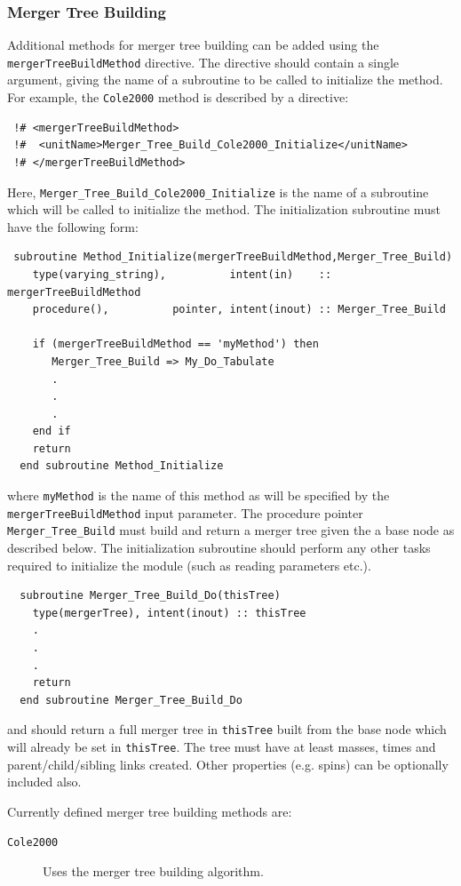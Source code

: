 \subsubsection{Merger Tree Building}\label{sec:MergerTreeBuildMethod}

Additional methods for merger tree building can be added using the {\tt mergerTreeBuildMethod} directive. The directive should contain a single argument, giving the name of a subroutine to be called to initialize the method. For example, the {\tt Cole2000} method is described by a directive:
\begin{verbatim}
 !# <mergerTreeBuildMethod>
 !#  <unitName>Merger_Tree_Build_Cole2000_Initialize</unitName>
 !# </mergerTreeBuildMethod>
\end{verbatim}
Here, {\tt Merger\_Tree\_Build\_Cole2000\_Initialize} is the name of a subroutine which will be called to initialize the method. The initialization subroutine must have the following form:
\begin{verbatim}
 subroutine Method_Initialize(mergerTreeBuildMethod,Merger_Tree_Build)
    type(varying_string),          intent(in)    :: mergerTreeBuildMethod
    procedure(),          pointer, intent(inout) :: Merger_Tree_Build
    
    if (mergerTreeBuildMethod == 'myMethod') then
       Merger_Tree_Build => My_Do_Tabulate
       .
       .
       .
    end if
    return
  end subroutine Method_Initialize
\end{verbatim}
where {\tt myMethod} is the name of this method as will be specified by the {\tt mergerTreeBuildMethod} input parameter. The procedure pointer {\tt Merger\_Tree\_Build} must build and return a merger tree given the a base node as described below. The initialization subroutine should perform any other tasks required to initialize the module (such as reading parameters etc.).

\begin{verbatim}
  subroutine Merger_Tree_Build_Do(thisTree)
    type(mergerTree), intent(inout) :: thisTree
    .
    .
    .
    return
  end subroutine Merger_Tree_Build_Do
\end{verbatim}
and should return a full merger tree in {\tt thisTree} built from the base node which will already be set in {\tt thisTree}. The tree must have at least masses, times and parent/child/sibling links created. Other properties (e.g. spins) can be optionally included also.

Currently defined merger tree building methods are:
\begin{description}
 \item [{\tt Cole2000}] Uses the \cite{cole_hierarchical_2000} merger tree building algorithm.
\end{description}

